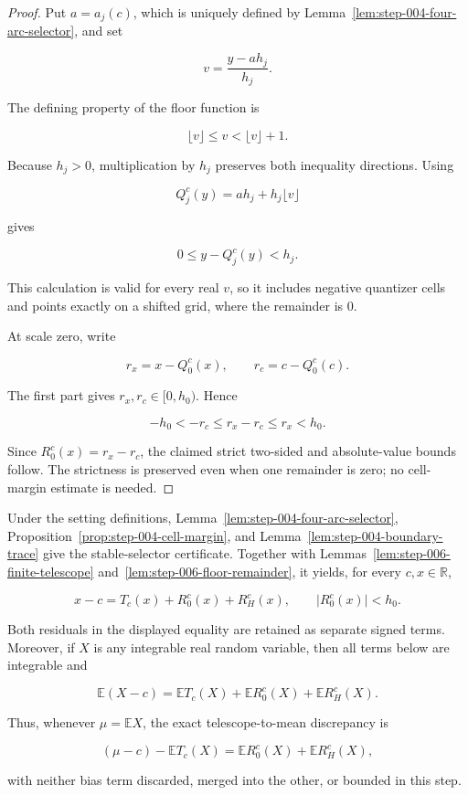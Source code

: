 \begin{proof}
Put \(a=a_j(c)\), which is uniquely defined by
Lemma~\ref{lem:step-004-four-arc-selector}, and set

\[
v=\frac{y-a h_j}{h_j}.
\]

The defining property of the floor function is

\[
\lfloor v\rfloor\leq v<\lfloor v\rfloor+1.
\]

Because \(h_j>0\), multiplication by \(h_j\) preserves both inequality directions. Using

\[
Q_j^c(y)=a h_j+h_j\lfloor v\rfloor
\]

gives

\[
0\leq y-Q_j^c(y)<h_j.
\]

This calculation is valid for every real \(v\), so it includes negative quantizer cells and points exactly on a shifted grid, where the remainder is \(0\).

At scale zero, write

\[
r_x=x-Q_0^c(x),
\qquad
r_c=c-Q_0^c(c).
\]

The first part gives \(r_x,r_c\in[0,h_0)\). Hence

\[
-h_0< -r_c\leq r_x-r_c\leq r_x<h_0.
\]

Since \(R_0^c(x)=r_x-r_c\), the claimed strict two-sided and absolute-value bounds follow. The strictness is preserved even when one remainder is zero; no cell-margin estimate is needed.
\end{proof}

\begin{proposition}\label{prop:step-006-residual-interface}
Under the setting definitions, Lemma~\ref{lem:step-004-four-arc-selector},
Proposition~\ref{prop:step-004-cell-margin}, and
Lemma~\ref{lem:step-004-boundary-trace} give the stable-selector certificate.
Together with Lemmas~\ref{lem:step-006-finite-telescope}
and~\ref{lem:step-006-floor-remainder}, it yields, for every
\(c,x\in\mathbb R\),

\[
x-c=T_c(x)+R_0^c(x)+R_H^c(x),
\qquad
\lvert R_0^c(x)\rvert<h_0.
\]

Both residuals in the displayed equality are retained as separate signed terms. Moreover, if \(X\) is any integrable real random variable, then all terms below are integrable and

\[
\mathbb E(X-c)
=\mathbb E T_c(X)
 +\mathbb E R_0^c(X)
 +\mathbb E R_H^c(X).
\]

Thus, whenever \(\mu=\mathbb E X\), the exact telescope-to-mean discrepancy is

\[
(\mu-c)-\mathbb E T_c(X)
=\mathbb E R_0^c(X)+\mathbb E R_H^c(X),
\]

with neither bias term discarded, merged into the other, or bounded in this step.
\end{proposition}

